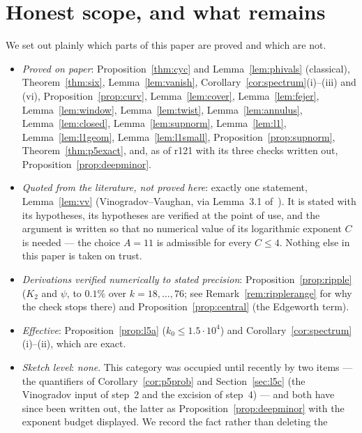 \documentclass[11pt,a4paper]{article}
\theoremstyle{plain}
\theoremstyle{definition}
\theoremstyle{remark}
\begin{document}
\section{Honest scope, and what remains}\label{sec:remains}

We set out plainly which parts of this paper are proved and which are not.

\begin{itemize}
\item \emph{Proved on paper}: Proposition~\ref{thm:cyc} and
      Lemma~\ref{lem:phivals} (classical), Theorem~\ref{thm:six},
      Lemma~\ref{lem:vanish}, Corollary~\ref{cor:spectrum}(i)--(iii) and (vi),
      Proposition~\ref{prop:curv}, Lemma~\ref{lem:cover}, Lemma~\ref{lem:fejer},
      Lemma~\ref{lem:window}, Lemma~\ref{lem:twist}, Lemma~\ref{lem:annulus},
      Lemma~\ref{lem:closed}, Lemma~\ref{lem:supnorm}, Lemma~\ref{lem:l1},
      Lemma~\ref{lem:l1geom}, Lemma~\ref{lem:l1small},
      Proposition~\ref{prop:supnorm}, Theorem~\ref{thm:p5exact},
      and, as of r121 with its three checks written out,
      Proposition~\ref{prop:deepminor}.
\item \emph{Quoted from the literature, not proved here}: exactly one statement,
      Lemma~\ref{lem:vv} (Vinogradov--Vaughan, via Lemma~3.1 of~\cite{Ku05}).
      It is stated with its hypotheses, its hypotheses are verified at the point
      of use, and the argument is written so that no numerical value of its
      logarithmic exponent $C$ is needed --- the choice $A=11$ is admissible for
      every $C\le4$. Nothing else in this paper is taken on trust.
\item \emph{Derivations verified numerically to stated precision}:
      Proposition~\ref{prop:ripple} ($K_2$ and $\psi$, to $0.1\%$ over
      $k=18,\dots,76$; see Remark~\ref{rem:ripplerange} for why the check stops
      there) and Proposition~\ref{prop:central} (the Edgeworth term).
\item \emph{Effective}: Proposition~\ref{prop:l5a}
      ($k_0\le1.5\cdot10^{4}$) and Corollary~\ref{cor:spectrum}(i)--(ii), which
      are exact.
\item \emph{Sketch level}: \emph{none}. This category was occupied until
      recently by two items --- the quantifiers of
      Corollary~\ref{cor:p5prob} and Section~\ref{sec:l5c} (the Vinogradov
      input of step~2 and the excision of step~4) --- and both have since been
      written out, the latter as Proposition~\ref{prop:deepminor} with the
      exponent budget displayed. We record the fact rather than deleting the

\end{itemize}
\end{document}
